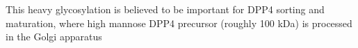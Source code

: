 This heavy glycosylation is believed to be important for DPP4 sorting and maturation, where high mannose DPP4 precursor (roughly 100 kDa) is processed in the Golgi apparatus \cite{Matter_1991}
